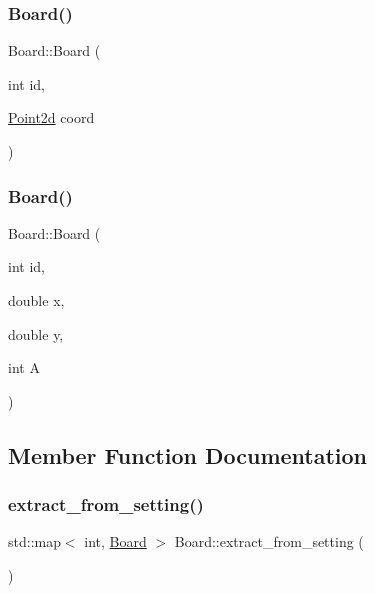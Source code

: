 \mbox{\label{class_board_af77a74155429debae2f0ee0ea424658c}} 
\subsubsection{\texorpdfstring{Board()}{Board()}\hspace{0.1cm}{\footnotesize\ttfamily [2/3]}}
{\footnotesize\ttfamily Board\+::\+Board (\begin{DoxyParamCaption}\item[{int}]{id,  }\item[{\hyperlink{class_point2d}{Point2d}}]{coord }\end{DoxyParamCaption})\hspace{0.3cm}{\ttfamily [inline]}}

\mbox{\label{class_board_abd0f454786cadfcbfbfc0a5bdf922542}} 
\subsubsection{\texorpdfstring{Board()}{Board()}\hspace{0.1cm}{\footnotesize\ttfamily [3/3]}}
{\footnotesize\ttfamily Board\+::\+Board (\begin{DoxyParamCaption}\item[{int}]{id,  }\item[{double}]{x,  }\item[{double}]{y,  }\item[{int}]{A }\end{DoxyParamCaption})\hspace{0.3cm}{\ttfamily [inline]}}



\subsection{Member Function Documentation}
\mbox{\label{class_board_a967d8a86e8fe2b1a2434392a1cdc9ee5}} 
\subsubsection{\texorpdfstring{extract\+\_\+from\+\_\+setting()}{extract\_from\_setting()}}
{\footnotesize\ttfamily std\+::map$<$ int, \hyperlink{class_board}{Board} $>$ Board\+::extract\+\_\+from\+\_\+setting (\begin{DoxyParamCaption}{ }\end{DoxyParamCaption})\hspace{0.3cm}{\ttfamily [static]}}


